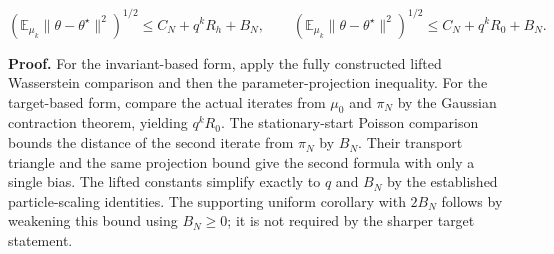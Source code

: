 \documentclass[11pt,a4paper]{report}
\begin{document}
\[\left(\mathbb E_{\mu_k}\|\theta-\theta^\star\|^2\right)^{1/2}\le C_N+q^kR_h+B_N,\qquad \left(\mathbb E_{\mu_k}\|\theta-\theta^\star\|^2\right)^{1/2}\le C_N+q^kR_0+B_N.\]


\textbf{Proof.} For the invariant-based form, apply the fully constructed lifted Wasserstein comparison and then the parameter-projection inequality. For the target-based form, compare the actual iterates from \(\mu_0\) and \(\pi_N\) by the Gaussian contraction theorem, yielding \(q^kR_0\). The stationary-start Poisson comparison bounds the distance of the second iterate from \(\pi_N\) by \(B_N\). Their transport triangle and the same projection bound give the second formula with only a single bias. The lifted constants simplify exactly to \(q\) and \(B_N\) by the established particle-scaling identities. The supporting uniform corollary with \(2B_N\) follows by weakening this bound using \(B_N\ge0\); it is not required by the sharper target statement.
\end{document}
